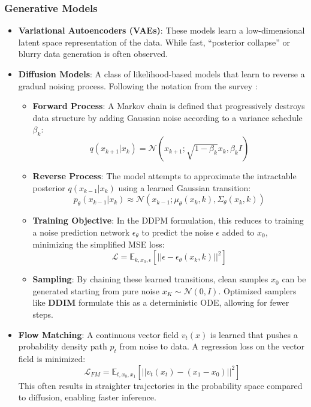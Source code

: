 \subsubsection{Generative Models}\label{generative-models}
\begin{itemize}
\item
  \textbf{Variational Autoencoders (VAEs)}: These models learn a
  low-dimensional latent space representation of the data. While fast,
  ``posterior collapse'' or blurry data generation is often observed.
\item
  \textbf{Diffusion Models}\label{basics-of-diffusion-implementation}: A class of likelihood-based models that
  learn to reverse a gradual noising process. Following the notation
  from the survey \cite{wolf2025diffusion}:

  \begin{itemize}
  \tightlist
  \item
    \textbf{Forward Process}: A Markov chain is defined that
    progressively destroys data structure by adding Gaussian noise
    according to a variance schedule \(\beta_k\):
    \[ q(x_{k+1} | x_k) = \mathcal{N}(x_{k+1}; \sqrt{1 - \beta_k} x_k, \beta_k I) \]
  \item
    \textbf{Reverse Process}: The model attempts to approximate the
    intractable posterior \(q(x_{k-1} | x_k)\) using a learned Gaussian
    transition:
    \[ p_\theta(x_{k-1} | x_k) \approx \mathcal{N}(x_{k-1}; \mu_\theta(x_k, k), \Sigma_\theta(x_k, k)) \]
  \item
    \textbf{Training Objective}: In the DDPM formulation, this reduces
    to training a noise prediction network \(\epsilon_\theta\) to
    predict the noise \(\epsilon\) added to \(x_0\), minimizing the
    simplified MSE loss:
    \[ \mathcal{L} = \mathbb{E}_{k, x_0, \epsilon} \left[ || \epsilon - \epsilon_\theta(x_k, k) ||^2 \right] \]
  \item
    \textbf{Sampling}: By chaining these learned transitions, clean
    samples \(x_0\) can be generated starting from pure noise
    \(x_K \sim \mathcal{N}(0, I)\). Optimized samplers like
    \textbf{DDIM} formulate this as a deterministic ODE, allowing for
    fewer steps.
  \end{itemize}
\item
  \textbf{Flow Matching}: A continuous vector field \(v_t(x)\) is
  learned that pushes a probability density path \(p_t\) from noise to
  data. A regression loss on the vector field is minimized:
  \[ \mathcal{L}_{FM} = \mathbb{E}_{t, x_0, x_1} \left[ || v_t(x_t) - (x_1 - x_0) ||^2 \right] \]
  This often results in straighter trajectories in the probability space
  compared to diffusion, enabling faster inference.
\end{itemize}

